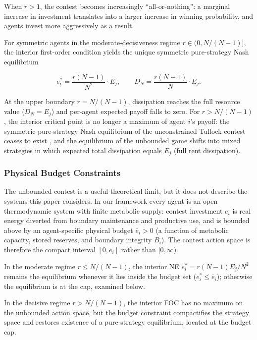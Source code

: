 \documentclass[11pt]{article}
\theoremstyle{plain}
\theoremstyle{definition}
\theoremstyle{remark}
\let\origsubsubsection\subsubsection
\renewcommand{\subsubsection}{\needspace{4\baselineskip}\origsubsubsection}
\begin{document}
When \(r > 1\), the contest becomes increasingly ``all-or-nothing'': a
marginal increase in investment translates into a larger increase in
winning probability, and agents invest more aggressively as a result.

For symmetric agents in the moderate-decisiveness regime
\(r \in (0, N/(N-1)]\), the interior first-order condition yields the
unique symmetric pure-strategy Nash equilibrium

\[e_i^* = \frac{r(N-1)}{N^2} \cdot E_j, \qquad D_N = \frac{r(N-1)}{N} \cdot E_j.\]

At the upper boundary \(r = N/(N-1)\), dissipation reaches the full
resource value (\(D_N = E_j\)) and per-agent expected payoff falls to
zero. For \(r > N/(N-1)\), the interior critical point is no longer a
maximum of agent \(i\)'s payoff: the symmetric pure-strategy Nash
equilibrium of the unconstrained Tullock contest ceases to exist
\citep{BayeKovenock-deVries1994}, and the equilibrium of the unbounded
game shifts into mixed strategies in which expected total dissipation
equals \(E_j\) (full rent dissipation).

\subsubsection{Physical Budget
Constraints}\label{physical-budget-constraints}

The unbounded contest is a useful theoretical limit, but it does not
describe the systems this paper considers. In our framework every agent
is an open thermodynamic system with finite metabolic supply: contest
investment \(e_i\) is real energy diverted from boundary maintenance and
productive use, and is bounded above by an agent-specific physical
budget \(\bar e_i > 0\) (a function of metabolic capacity, stored
reserves, and boundary integrity \(B_i\)). The contest action space is
therefore the compact interval \([0, \bar e_i]\) rather than
\([0, \infty)\).

In the moderate regime \(r \leq N/(N-1)\), the interior NE
\(e_i^* = r(N-1) E_j/N^2\) remains the equilibrium whenever it lies
inside the budget set (\(e_i^* \leq \bar e_i\)); otherwise the
equilibrium is at the cap, examined below.

In the decisive regime \(r > N/(N-1)\), the interior FOC has no maximum
on the unbounded action space, but the budget constraint compactifies
the strategy space and restores existence of a pure-strategy
equilibrium, located at the budget cap.
\end{document}
